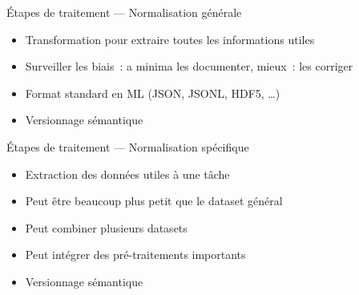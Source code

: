 \begin{frame}{Étapes de traitement --- Normalisation générale}
  \begin{itemize}[<+->]
    \item Transformation pour extraire toutes les informations utiles
    \item Surveiller les biais~: a minima les documenter, mieux~: les corriger
    \item Format standard en ML (JSON, JSONL, HDF5, …)
    \item Versionnage sémantique
  \end{itemize}  
\end{frame}

\begin{frame}{Étapes de traitement --- Normalisation spécifique}
  \begin{itemize}[<+->]
    \item Extraction des données utiles à une tâche
    \item Peut être beaucoup plus petit que le dataset général
    \item Peut combiner plusieurs datasets
    \item Peut intégrer des pré-traitements importants
    \item Versionnage sémantique
  \end{itemize}  
\end{frame}
